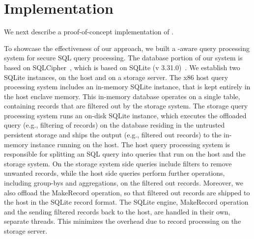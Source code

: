 \section{Implementation}
\label{sec:implementation}

We next describe a proof-of-concept implementation of \project{}.

\label{subsec:sub-sec-ndp-eng}
To showcase the effectiveness of our approach, we built a \csd-aware query processing system for secure SQL query processing.
The database portion of our system is based on SQLCipher~\cite{sqlcipher}, which is based on SQLite (v 3.31.0)~\cite{sqlite}. We establish two SQLite instances, on the host and on a storage server.
The x86 host query processing system includes an in-memory SQLite instance, that is kept entirely in the host enclave memory. This in-memory database operates on a single table, containing records that are filtered out by the storage system. 
The storage query processing system runs an on-disk SQLite instance, which executes the offloaded query (e.g., filtering of records) on the database residing in the untrusted persistent storage and ships the output (e.g., filtered out records) to the in-memory instance running on the host.
The host query processing system is responsible for splitting an SQL query into queries that run on the host and the storage system. On the storage system side queries include filters to remove unwanted records, while the
host side queries perform further operations, including group-bys and aggregations, on the filtered out records. %
Moreover, %
we also offload the MakeRecord operation, so that filtered out records are shipped to the host in the SQLite record format. 
The SQLite engine, MakeRecord operation and the sending filtered records back to the host, are handled in their own, separate threads. This minimizes the overhead due to record processing on the storage server.
\fi

